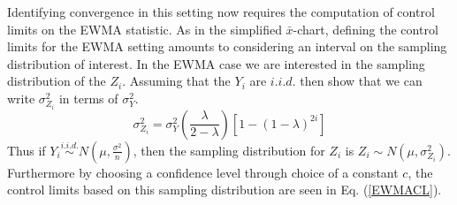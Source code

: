 \documentclass{article}
\def \rastLamb {
        0.4
}
\begin{document}


Identifying convergence in this setting now requires the computation of 
control limits on the EWMA statistic. As in the simplified $\bar x$-chart, 
defining the control limits for the EWMA setting amounts to considering an 
interval on the sampling distribution of interest. In the EWMA case we are 
interested in the sampling distribution of the $Z_i$. Assuming that the $Y_i$ 
are $i.i.d.$ then \cite{ewmaPaper} show that we can write $\sigma^2_{Z_i}$ in 
terms of $\sigma^2_{Y}$. 
%
\begin{equation}
\sigma^2_{Z_i} = \sigma^2_{Y}\left(\frac{\lambda}{2-\lambda}\right)\left[1-(1-\lambda)^{2i}\right]
\end{equation}
Thus if $Y_i \stackrel{i.i.d.}{\sim} N\left(\mu, \frac{\sigma^2}{n}\right)$, 
then the sampling distribution for $Z_i$ is $Z_i \sim N\left(\mu, \sigma^2_{Z_i}\right)$.
Furthermore by choosing a confidence level through choice of a constant $c$, 
the control limits based on this sampling distribution are seen in Eq. (\ref{EWMACL}).
\end{document}
